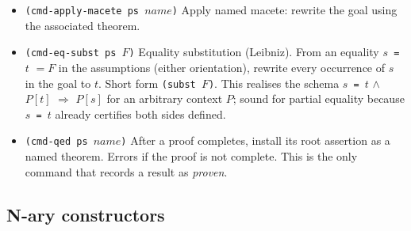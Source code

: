 \begin{itemize}
\item \texttt{(cmd-apply-macete ps $\mathit{name}$)}
  Apply named macete: rewrite the goal using the associated theorem.

\item \begin{sloppypar}\texttt{(cmd-eq-subst ps $F$)}
  Equality substitution (Leibniz).  From an equality \texttt{$s$ = $t$} $= F$
  in the assumptions (either orientation), rewrite every occurrence of $s$
  in the goal to $t$.  Short form \texttt{(subst $F$)}.  This realises the
  schema \texttt{$s$ = $t$} $\wedge$ \texttt{$P[t]$} $\Rightarrow$
  \texttt{$P[s]$} for an arbitrary context $P$; sound for partial equality
  because \texttt{$s$ = $t$} already certifies both sides
  defined.\end{sloppypar}

\item \texttt{(cmd-qed ps $\mathit{name}$)}
  After a proof completes, install its root assertion as a named theorem.
  Errors if the proof is not complete.  This is the only command that
  records a result as \emph{proven}.

\end{itemize}

\subsection{N-ary constructors}
\label{sec:nary-proof-commands}

